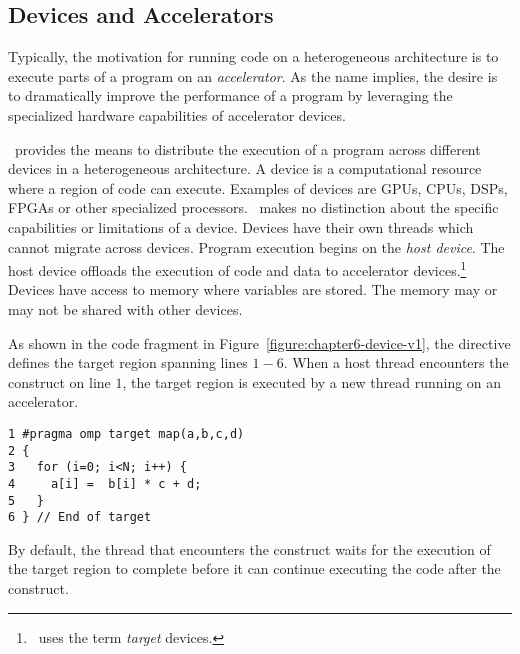 \subsection{Devices and Accelerators}
\label{sec:06.devices}

Typically, the motivation for running code on a heterogeneous architecture is
to execute parts of a program on an \emph{accelerator}.  As the name implies,
the desire is to dramatically improve the performance of a program by
leveraging the specialized hardware capabilities of accelerator devices.  

\OMP\ provides the means to distribute the execution of a program across
different devices in a heterogeneous architecture.  A device is a computational
resource where a region of code can execute.  Examples of devices are GPUs,
CPUs, DSPs, FPGAs or other specialized processors.  \OMP\ makes no distinction
about the specific capabilities or limitations of a device.  Devices have their
own threads which cannot migrate across devices.  Program execution begins on
the \emph{host device}.  The host device offloads the execution of code and
data to accelerator devices.\footnote{\OMP\ uses the term \emph{target}
devices.}  Devices have access to memory where variables are stored.  The
memory may or may not be shared with other devices.

As shown in the code fragment in Figure~\ref{figure:chapter6-device-v1}, the
 directive defines the target region spanning lines
$1-6$.   When a host thread encounters the  construct on line
$1$, the target region is executed by a new thread running on an accelerator. 

\begin{figure*}[!b]
\begin{verbatim}
1 #pragma omp target map(a,b,c,d)
2 {
3   for (i=0; i<N; i++) {
4     a[i] =  b[i] * c + d;
5   }
6 } // End of target
\end{verbatim}
\caption{ \textbf {Code fragment with one target region} -- \small
          The target region is executed by a thread running on
          an accelerator.
         }
\label{figure:chapter6-device-v1}
\end{figure*}

By default, the thread that encounters the  construct waits for
the execution of the target region to complete before it can continue executing
the code after the  construct.

